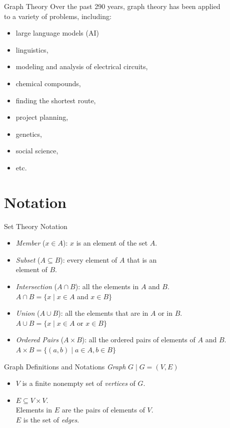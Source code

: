 \documentclass[14pt,aspectratio=1610]{beamer}
\begin{document}
\begin{frame}{Graph Theory}
Over the past 290 years, graph theory has been applied \\
to a variety of problems, including:
\begin{itemize}
  \item  large language models (AI)
  \item  linguistics,
  \item  modeling and analysis of electrical circuits,
  \item  chemical compounds,
  \item  finding the shortest route,
  \item  project planning,
  \item  genetics,
  \item  social science,
  \item  etc.
\end{itemize}
\end{frame}

\section{Notation}

\begin{frame}{Set Theory Notation}
\begin{itemize}
  \item
    \emph{Member} (\(x \in A\)): \(x\) is an element of the set \(A\).
  \item
    \emph{Subset} (\(A \subseteq B\)): every element of \(A\) that is an\\element of \(B\).
  \item
    \emph{Intersection} (\(A \cap B\)): all the elements in \(A\) and \(B\).\\
    \(A \cap B = \{x \mid x \in A\) and \(x \in B\} \)
  \item
    \emph{Union} (\(A \cup B\)): all the elements that are in \(A\) or in \(B\).\\
    \(A \cup B = \{x \mid x \in A\) or \(x \in B\} \)
  \item
    \emph{Ordered Pairs} (\(A \times B\)): all the ordered pairs of elements of \(A\) and \(B\).\\
    \(A \times B = \{(a, b) \mid a \in A, b \in B\} \)

\end{itemize}
\end{frame}

\begin{frame}{Graph Definitions and Notations}
\emph{Graph} \(G \mid G = (V, E)\)
\begin{itemize}
  \item
    \(V\) is a finite nonempty set of \emph{vertices} of \(G\).
  \item
    \(E \subseteq V \times V\).\\
    Elements in \(E\) are the pairs of elements of \(V\).\\
    \(E\) is the set of \emph{edges}.
\end{itemize}
\end{frame}
\end{document}

